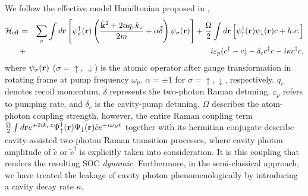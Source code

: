 \documentclass[atoms,article,submit,moreauthors,pdftex,12pt,a4paper]{mdpi}
\def\ba{\begin{eqnarray}}
\def\ea{\end{eqnarray}}
\begin{document}
We follow the effective model Hamiltonian proposed in \cite{cavitySOC}, 
\ba
 \mathcal{H}_{\rm eff}& = & \sum_\sigma\int d{\bf r}\left[ \psi^\dagger_\sigma({\bf r})\left(\frac{ \hat{{\bf k}}^2+ 2\alpha q_r {k}_z}{2m}+\alpha\tilde{\delta}\right)\psi_\sigma({\bf r})\right]+  \frac{\Omega}{2}\int d{\bf r}\left[{\psi}_{\uparrow}^{\dagger}({\bf r}){\psi}_{\downarrow}({\bf r})c+ h.c. \right]\nonumber \\
 & + & i\varepsilon_{p}(c^{\dagger}-c)-\delta_c c^{\dagger}c-i\kappa c^{\dagger}c, \label{effH}
 \ea
where $\psi_\sigma({\bf r})$ ($\sigma = \uparrow$, $\downarrow$) is the atomic operator after gauge transformation in rotating frame at pump frequency $\omega_p$. $\alpha=\pm 1$ for $\sigma=\uparrow,\downarrow$, respectively. $q_r$ denotes recoil momentum, $\tilde{\delta}$ represents the two-photon Raman detuning, $\varepsilon_p$ refers to pumping rate, and $\delta_c$ is the cavity-pump detuning. $\Omega$ describes the atom-photon coupling strength, however, the entire Raman coupling term $ \frac{\Omega}{2}\int d{\bf r}e^{+2i k_{r}z}\Psi_{\uparrow}^{\dagger}({\bf r})\Psi_{\downarrow}({\bf r})\tilde{c}e^{+i\omega_{R}t}$ together with its hermitian conjugate describe cavity-assisted two-photon Raman transition processes, where cavity photon amplitude of $\tilde{c}$ or $\tilde{c}^\dag$ is explicitly taken into consideration. It is this coupling that renders the resulting SOC \emph{dynamic}. Furthermore, in the semi-classical approach, we have treated the leakage of cavity photon phenomenologically by introducing a cavity decay rate $\kappa$. 
\end{document}
